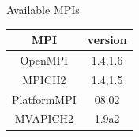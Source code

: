 \documentclass[final,t]{beamer}
\begin{document}
\begin{frame}[fragile]{}
\begin{columns}[t]
\begin{column}{.32\linewidth}
\begin{columns}[t]
\begin{column}{.35\linewidth}
\begin{block}{Available MPIs}
\begin{center}
      \begin{tabular}{|c|c|}
      \hline 
      \textbf{MPI} & \textbf{version} \\ 
      \hline 
      OpenMPI & 1.4,1.6  \\ 
      \hline 
      MPICH2 & 1.4,1.5  \\ 
      \hline 
      PlatformMPI & 08.02  \\ 
      \hline 
      MVAPICH2 & 1.9a2  \\ 
      \hline 
      \end{tabular} 
      \end{center}
        \vspace*{-2ex}
      \end{block}
      \end{column}
  \end{columns}


\end{column}
\end{columns}
\end{frame}
\end{document}
